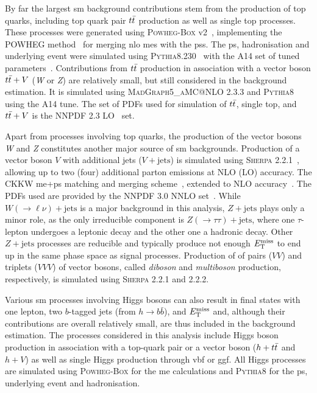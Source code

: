 By far the largest \gls{sm} background contributions stem from the production of top quarks, including top quark pair $t\bar{t}$ production as well as single top processes. These processes were generated using \textsc{Powheg-Box} v2~\cite{PowhegBox:2010xd}, implementing the \textsc{POWHEG} method~\cite{Powheg1,Powheg2} for merging \gls{nlo} \glspl{me} with the \glspl{ps}. The \gls{ps}, hadronisation and underlying event were simulated using \textsc{Pythia8.230}~\cite{Pythia8:2007gs} with the A14 set of tuned parameters~\cite{ATL-PHYS-PUB-2014-021}. Contributions from $t\bar{t}$ production in association with a vector boson $t\bar{t}+V$ (\textit{W} or \textit{Z}) are relatively small, but still considered in the background estimation. It is simulated using \textsc{MadGraph5\_aMC@NLO} 2.3.3 and \textsc{Pythia8} using the A14 tune. The set of \glspl{PDF} used for simulation of $t\bar{t}$, single top, and $t\bar{t}+V$ is the NNPDF 2.3 LO~\cite{Ball:2012cx} set.

Apart from processes involving top quarks, the production of the vector bosons \textit{W} and \textit{Z} constitutes another major source of \gls{sm} backgrounds. Production of a vector boson $V$ with additional jets ($V+\mathrm{jets}$) is simulated using \textsc{Sherpa} 2.2.1~\cite{Gleisberg:2008ta,Bothmann:2019yzt}, allowing up to two (four) additional parton emissions at NLO (LO) accuracy. The CKKW \gls{me}+\gls{ps} matching and merging scheme~\cite{Hoeche:2009rj,Catani:2001cc}, extended to NLO accuracy~\cite{Hoeche:2012yf}. The \glspl{PDF} used are provided by the NNPDF 3.0 NNLO set~\cite{Ball:2014uwa}. While $W(\rightarrow\ell\nu)+\mathrm{jets}$ is a major background in this analysis, $Z+\mathrm{jets}$ plays only a minor role, as the only irreducible component is $Z(\rightarrow\tau\tau)+\mathrm{jets}$, where one $\tau$-lepton undergoes a leptonic decay and the other one a hadronic decay. Other $Z+\mathrm{jets}$ processes are reducible and typically produce not enough $E_{\textrm{T}}^{\textrm{miss}}$ to end up in the same phase space as signal processes. Production of of pairs ($VV$) and triplets ($VVV$) of vector bosons, called \textit{diboson} and \textit{multiboson} production, respectively, is simulated using \textsc{Sherpa} 2.2.1 and 2.2.2.

Various \gls{sm} processes involving Higgs bosons can also result in final states with one lepton, two $b$-tagged jets (from $h\rightarrow b\bar{b}$), and $E_{\textrm{T}}^{\textrm{miss}}$ and, although their contributions are overall relatively small, are thus included in the background estimation. The processes considered in this analysis include Higgs boson production in association with a top-quark pair or a vector boson ($h+t\bar{t}$ and $h+V$) as well as single Higgs production through \gls{vbf} or \gls{ggf}. All Higgs processes are simulated using \textsc{Powheg-Box} for the \gls{me} calculations and \textsc{Pythia8} for the \gls{ps}, underlying event and hadronisation. 

